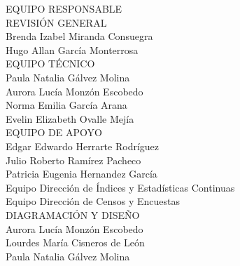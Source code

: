 {\Bold \LARGE EQUIPO RESPONSABLE}\\[2cm]
{\Bold \large \color{color1!89!black} REVISIÓN GENERAL}\\[0.2cm]
Brenda Izabel Miranda Consuegra\\
Hugo Allan García Monterrosa\\[0.8cm]
{\Bold \large \color{color1!89!black} EQUIPO TÉCNICO}\\[0.2cm]
Paula Natalia Gálvez Molina\\
Aurora Lucía Monzón Escobedo\\
Norma Emilia García Arana\\
Evelin Elizabeth Ovalle Mejía\\[0.8cm]
{\Bold \large \color{color1!89!black} EQUIPO DE APOYO}\\[0.2cm]
Edgar Edwardo Herrarte Rodríguez\\
Julio Roberto Ramírez Pacheco \\
Patricia Eugenia Hernandez García\\
Equipo Dirección de Índices y Estadísticas Continuas\\
Equipo Dirección de Censos y Encuestas\\[0.8cm]
{\Bold \large \color{color1!89!black} DIAGRAMACIÓN Y DISEÑO}\\[0.2cm]
Aurora Lucía Monzón Escobedo\\
Lourdes María Cisneros de León\\
Paula Natalia Gálvez Molina\\[0.8cm]
